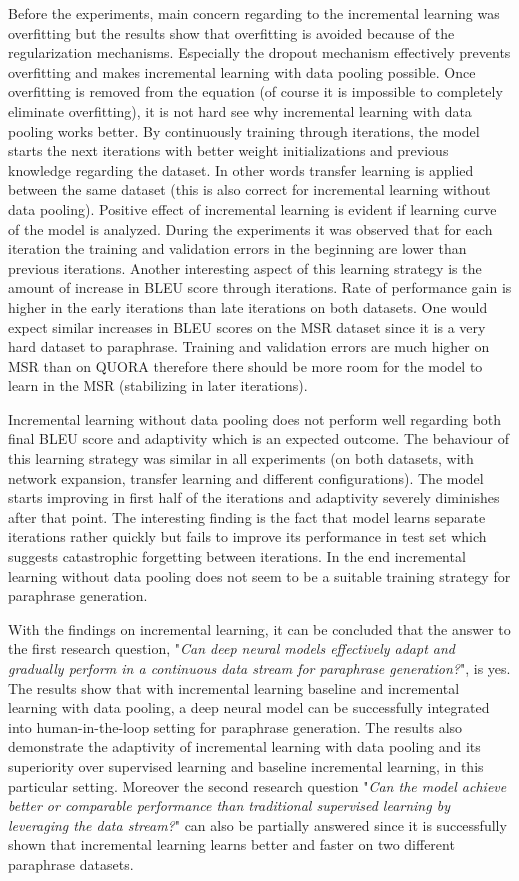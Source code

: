 Before the experiments, main concern regarding to the incremental learning was overfitting but the results show that overfitting is avoided because of the regularization mechanisms. Especially the dropout mechanism effectively prevents overfitting and makes incremental learning with data pooling possible. Once overfitting is removed from the equation (of course it is impossible to completely eliminate overfitting), it is not hard see why incremental learning with data pooling works better. By continuously training through iterations, the model starts the next iterations with better weight initializations and previous knowledge regarding the dataset. In other words transfer learning is applied between the same dataset (this is also correct for incremental learning without data pooling). Positive effect of incremental learning is evident if learning curve of the model is analyzed. During the experiments it was observed that for each iteration the training and validation errors in the beginning are lower than previous iterations. Another interesting aspect of this learning strategy is the amount of increase in BLEU score through iterations. Rate of performance gain is higher in the early iterations than late iterations on both datasets. One would expect similar increases in BLEU scores on the MSR dataset since it is a very hard dataset to paraphrase. Training and validation errors are much higher on MSR than on QUORA therefore there should be more room for the model to learn in the MSR (stabilizing in later iterations).

Incremental learning without data pooling does not perform well regarding both final BLEU score and adaptivity which is an expected outcome. The behaviour of this learning strategy was similar in all experiments (on both datasets, with network expansion, transfer learning and different configurations). The model starts improving in first half of the iterations and adaptivity severely diminishes after that point. The interesting finding is the fact that model learns separate iterations rather quickly but fails to improve its performance in test set which suggests catastrophic forgetting between iterations. In the end incremental learning without data pooling does not seem to be a suitable training strategy for paraphrase generation.

With the findings on incremental learning, it can be concluded that the answer to the first research question, "\textit{Can deep neural models effectively adapt and gradually perform in a continuous data stream for paraphrase generation?}", is yes. The results show that with incremental learning baseline and incremental learning with data pooling, a deep neural model can be successfully integrated into human-in-the-loop setting for paraphrase generation. The results also demonstrate the adaptivity of incremental learning with data pooling and its superiority over supervised learning and baseline incremental learning, in this particular setting. Moreover the second research question "\textit{Can the model achieve better or comparable performance than traditional supervised learning by leveraging the data stream?}" can also be partially answered since it is successfully shown that incremental learning learns better and faster on two different paraphrase datasets.

